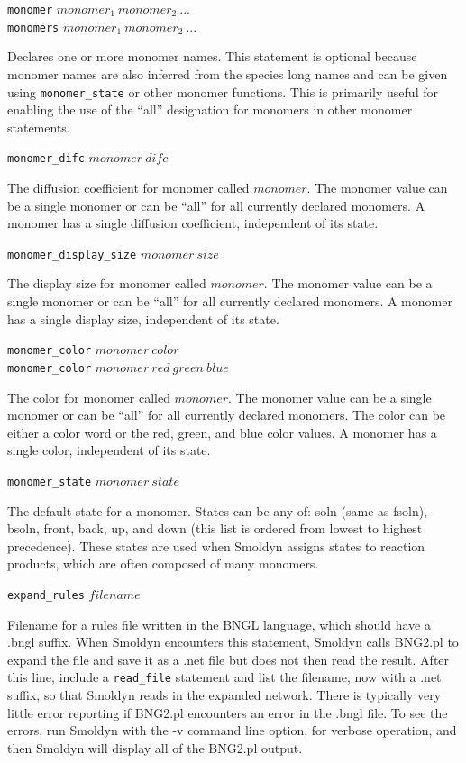 \documentclass {scrbook}
\newcommand {\ttt} {\texttt}
\begin{document}
\begin{description}
\item{\ttt{monomer} $monomer_1\ monomer_2\ ...$\\
\ttt{monomers} $monomer_1\ monomer_2\ ...$}

Declares one or more monomer names. This statement is optional because monomer names are also inferred from the species long names and can be given using \ttt{monomer\_state} or other monomer functions. This is primarily useful for enabling the use of the ``all'' designation for monomers in other monomer statements.

\item{\ttt{monomer\_difc} $monomer\ difc$}

The diffusion coefficient for monomer called $monomer$. The monomer value can be a single monomer or can be ``all'' for all currently declared monomers. A monomer has a single diffusion coefficient, independent of its state.

\item{\ttt{monomer\_display\_size} $monomer\ size$}

The display size for monomer called $monomer$. The monomer value can be a single monomer or can be ``all'' for all currently declared monomers. A monomer has a single display size, independent of its state.

\item{\ttt{monomer\_color} $monomer\ color$\\
\ttt{monomer\_color} $monomer\ red\ green\ blue$}

The color for monomer called $monomer$. The monomer value can be a single monomer or can be ``all'' for all currently declared monomers. The color can be either a color word or the red, green, and blue color values. A monomer has a single color, independent of its state.

\item{\ttt{monomer\_state} $monomer\ state$}

The default state for a monomer. States can be any of: soln (same as fsoln), bsoln, front, back, up, and down (this list is ordered from lowest to highest precedence). These states are used when Smoldyn assigns states to reaction products, which are often composed of many monomers.

\item{\ttt{expand\_rules} $filename$}

Filename for a rules file written in the BNGL language, which should have a .bngl suffix. When Smoldyn encounters this statement, Smoldyn calls BNG2.pl to expand the file and save it as a .net file but does not then read the result. After this line, include a \ttt{read\_file} statement and list the filename, now with a .net suffix, so that Smoldyn reads in the expanded network. There is typically very little error reporting if BNG2.pl encounters an error in the .bngl file. To see the errors, run Smoldyn with the -v command line option, for verbose operation, and then Smoldyn will display all of the BNG2.pl output.

\end{description}
\end{document}
